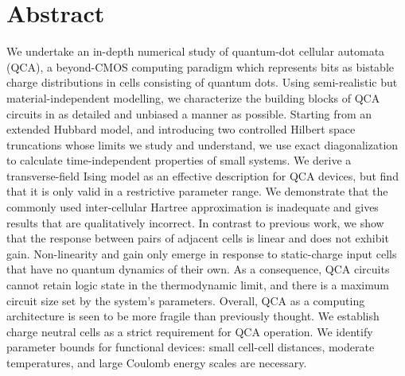 \chapter*{Abstract}

\begin{doublespace}
We undertake an in-depth numerical study of quantum-dot cellular automata (QCA),
a beyond-CMOS computing paradigm which represents bits as bistable charge
distributions in cells consisting of quantum dots. Using semi-realistic but
material-independent modelling, we characterize the building blocks of QCA
circuits in as detailed and unbiased a manner as possible.  Starting from an
extended Hubbard model, and introducing two controlled Hilbert space truncations
whose limits we study and understand, we use exact diagonalization to calculate
time-independent properties of small systems. We derive a transverse-field Ising
model as an effective description for QCA devices, but find that it is only
valid in a restrictive parameter range. We demonstrate that the commonly used
inter-cellular Hartree approximation is inadequate and gives results that are
qualitatively incorrect.  In contrast to previous work, we show that the
response between pairs of adjacent cells is linear and does not exhibit gain.
Non-linearity and gain only emerge in response to static-charge input cells that
have no quantum dynamics of their own. As a consequence, QCA circuits cannot
retain logic state in the thermodynamic limit, and there is a maximum circuit
size set by the system's parameters. Overall, QCA as a computing architecture is
seen to be more fragile than previously thought. We establish charge neutral
cells as a strict requirement for QCA operation. We identify parameter bounds
for functional devices: small cell-cell distances, moderate temperatures, and
large Coulomb energy scales are necessary.
\end{doublespace}
